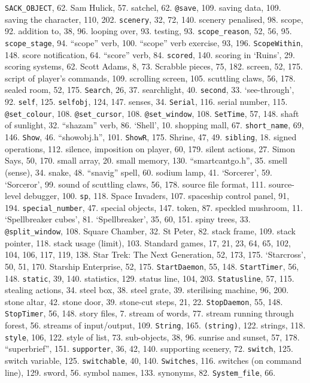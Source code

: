 {{{{{\tt SACK\_OBJECT}}, 62.
Sam Hulick, 57.
satchel, 62.
{{\tt @save}}, 109.
saving data, 109.
saving the character, 110, 202.
{{\tt scenery}}, 32, 72, 140.
scenery penalised, 98.
scope, 92.
\quad  addition to, 38, 96.
\quad  looping over, 93.
\quad  testing, 93.
{{\tt scope\_reason}}, 52, 56, 95.
{{\tt scope\_stage}}, 94.
``scope'' verb, 100.
``scope'' verb exercise, 93, 196.
{{\tt ScopeWithin}}, 148.
score notification, 64.
``score'' verb, 84.
{{\tt scored}}, 140.
scoring in `Ruins', 29.
scoring systems, 62.
Scott Adams, 8, 73.
Scrabble pieces, 75, 182.
screen, 52, 175.
script of player's commands, 109.
scrolling screen, 105.
scuttling claws, 56, 178.
sealed room, 52, 175.
{{\tt Search}}, 26, 37.
searchlight, 40.
{{\tt second}}, 33.
`see-through', 92.
{{\tt self}}, 125.
{{\tt selfobj}}, 124, 147.
senses, 34.
{{\tt Serial}}, 116.
serial number, 115.
{{\tt @set\_colour}}, 108.
{{\tt @set\_cursor}}, 108.
{{\tt @set\_window}}, 108.
{{\tt SetTime}}, 57, 148.
shaft of sunlight, 32.
``shazam'' verb, 86.
`Shell', 10.
shopping mall, 67.
{{\tt short\_name}}, 69, 146.
{{\tt Show}}, 46.
``showobj.h'', 101.
{{\tt ShowR}}, 175.
Shrine, 47, 49.
{{\tt sibling}}, 18.
signed operations, 112.
silence, imposition on player, 60, 179.
silent actions, 27.
Simon Says, 50, 170.
small array, 20.
small memory, 130.
``smartcantgo.h'', 35.
smell (sense), 34.
snake, 48.
``snavig'' spell, 60.
sodium lamp, 41.
`Sorcerer', 59.
`Sorceror', 99.
sound of scuttling claws, 56, 178.
source file format, 111.
source-level debugger, 100.
{{\tt sp}}, 118.
Space Invaders, 107.
spaceship control panel, 91, 194.
{{\tt special\_number}}, 47.
special objects, 147.
 token, 87.
speckled mushroom, 11.
`Spellbreaker cubes', 81.
`Spellbreaker', 35, 60, 151.
spiny trees, 33.
{{\tt @split\_window}}, 108.
Square Chamber, 32.
St Peter, 82.
stack frame, 109.
stack pointer, 118.
stack usage (limit), 103.
Standard games, 17, 21, 23, 64, 65, 102, 104, 106, 117, 119, 138.
Star Trek: The Next Generation, 52, 173, 175.
`Starcross', 50, 51, 170.
Starship Enterprise, 52, 175.
{{\tt StartDaemon}}, 55, 148.
{{\tt StartTimer}}, 56, 148.
{{\tt static}}, 39, 140.
statistics, 129.
status line, 104, 203.
{{\tt Statusline}}, 57, 115.
stealing actions, 34.
steel box, 38.
steel grate, 39.
sterilising machine, 96, 200.
stone altar, 42.
stone door, 39.
stone-cut steps, 21, 22.
{{\tt StopDaemon}}, 55, 148.
{{\tt StopTimer}}, 56, 148.
story files, 7.
stream of words, 77.
stream running through forest, 56.
streams of input/output, 109.
{{\tt String}}, 165.
{{\tt (string)}}, 122.
strings, 118.
{{\tt style}}, 106, 122.
style of list, 73.
sub-objects, 38, 96.
sunrise and sunset, 57, 178.
``superbrief'', 151.
{{\tt supporter}}, 36, 42, 140.
supporting scenery, 72.
{{\tt switch}}, 125.
switch variable, 125.
{{\tt switchable}}, 40, 140.
{{\tt Switches}}, 116.
switches (on command line), 129.
sword, 56.
symbol names, 133.
synonyms, 82.
{{\tt System\_file}}, 66.

}}}
